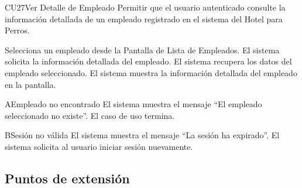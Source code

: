 ﻿%

\begin{UseCase}{CU27}{Ver Detalle de Empleado}{
	Permitir que el usuario autenticado consulte la información detallada de un empleado registrado en el sistema del Hotel para Perros.
}
\end{UseCase}

\begin{UCtrayectoria}
	\UCpaso[\UCactor] Selecciona un empleado desde la Pantalla de Lista de Empleados.
	\UCpaso El sistema solicita la información detallada del empleado.
	\UCpaso El sistema recupera los datos del empleado seleccionado.
	\UCpaso El sistema muestra la información detallada del empleado en la pantalla.
\end{UCtrayectoria}

\begin{UCtrayectoriaA}{A}{Empleado no encontrado}
	\UCpaso El sistema muestra el mensaje ``El empleado seleccionado no existe''.
	\UCpaso El caso de uso termina.
\end{UCtrayectoriaA}

\begin{UCtrayectoriaA}{B}{Sesión no válida}
	\UCpaso El sistema muestra el mensaje ``La sesión ha expirado''.
	\UCpaso El sistema solicita al usuario iniciar sesión nuevamente.
\end{UCtrayectoriaA}

\subsection{Puntos de extensión}

